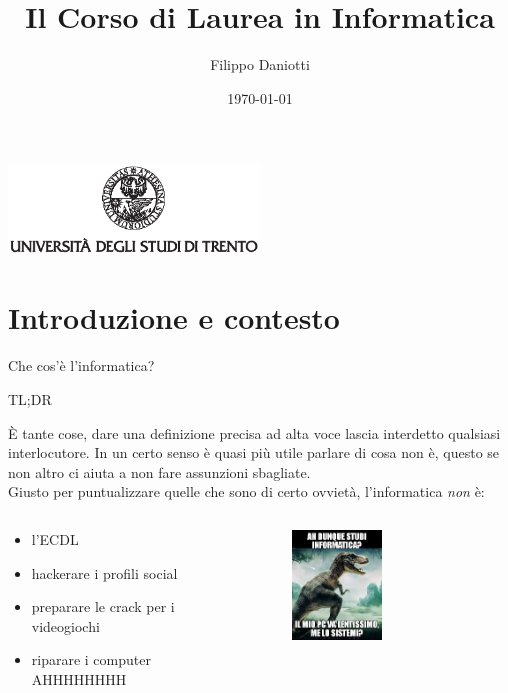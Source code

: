 \documentclass[aspectratio=1610]{beamer}
\title{Il Corso di Laurea in Informatica}
\author{Filippo Daniotti}
\date{\today}
\institute[DISI]{Dipartimento di Ingegneria e Scienza dell'Informazione}
\begin{document}
	\begin{frame}[plain]
		\addtocounter{framenumber}{-1}
		\centering
		\includegraphics[width=0.5\textwidth, keepaspectratio]{logo-unitn.eps}		
		\titlepage
	\end{frame}

	\section{Introduzione e contesto}
	\begin{frame}[fragile]{Che cos'è l'informatica?}
		\begin{center}
			\Large{TL;DR}\\
		\end{center}		
		È tante cose, dare una definizione precisa ad alta voce lascia interdetto qualsiasi interlocutore. In un certo senso è quasi più utile parlare di cosa \alert<1>{non} è, questo se non altro ci aiuta a non fare assunzioni sbagliate.\\
		\bigskip
		\pause
		Giusto per puntualizzare quelle che sono di certo ovvietà, l'informatica \emph{non} è:
		\begin{columns}
			\begin{column}{0.55\textwidth}
				\begin{itemize}
					\item l'ECDL 
					\item hackerare i profili social 
					\item preparare le crack per i videogiochi 
					\item riparare i computer \Large{AHHHHHHHH} 
				\end{itemize}		
			\end{column}
			 {
				\begin{column}{0.4\textwidth}
					\begin{figure}
						\includegraphics[width=0.5\textwidth, keepaspectratio]{memino.jpg}	
					\end{figure}
				\end{column}
			}
		\end{columns}
	\end{frame}
\end{document}
